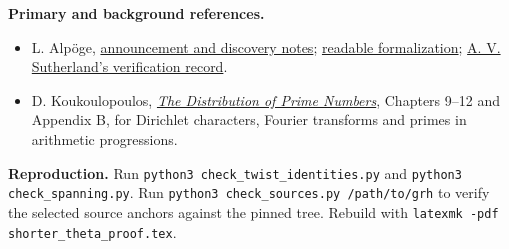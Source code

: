 \documentclass[11pt]{article}
\begin{document}
\textbf{Primary and background references.}
\begin{itemize}\setlength\itemsep{0pt}
\item L. Alp\"oge, \href{https://alpo.ge/remark.pdf}{announcement and discovery notes}; \href{https://github.com/lsernau/grh-lean/tree/72fead102f663d5c7a407964a13dc0cf9d977207/grh}{readable formalization}; \href{https://math.mit.edu/~drew/shortgrh/}{A. V. Sutherland's verification record}.
\item D. Koukoulopoulos, \href{https://dms.umontreal.ca/~koukoulo/documents/publications/primes.pdf}{\emph{The Distribution of Prime Numbers}}, Chapters 9--12 and Appendix B, for Dirichlet characters, Fourier transforms and primes in arithmetic progressions.
\end{itemize}
\textbf{Reproduction.} Run \texttt{python3 check\_twist\_identities.py} and \texttt{python3 check\_spanning.py}. Run \texttt{python3 check\_sources.py /path/to/grh} to verify the selected source anchors against the pinned tree. Rebuild with \texttt{latexmk -pdf shorter\_theta\_proof.tex}.
\end{document}
